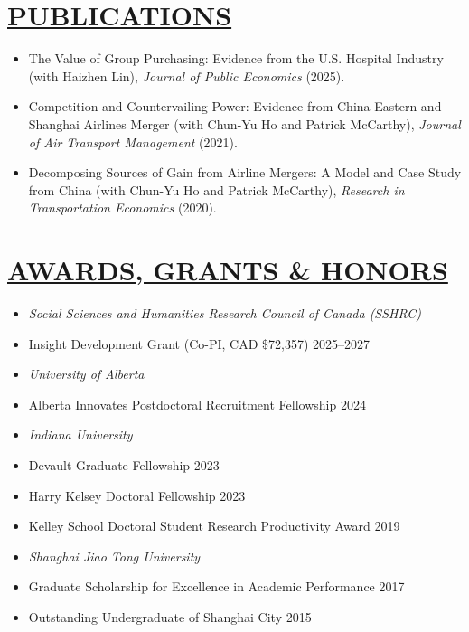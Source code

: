 \documentclass{res}
\begin{document}
\begin{resume}
\section{\large{\ul{PUBLICATIONS}}}
\vspace{1.8em}
\begin{itemize}[leftmargin=15pt,labelindent=-15pt,itemindent=-15pt,itemsep=0.1em]
    \item[] The Value of Group Purchasing: Evidence from the U.S. Hospital Industry (with Haizhen Lin), \textit{Journal of Public Economics} (2025).
    \item[] Competition and Countervailing Power: Evidence from China Eastern and Shanghai Airlines Merger (with Chun-Yu Ho and Patrick McCarthy), \textit{Journal of Air Transport Management} (2021).
    \item[] Decomposing Sources of Gain from Airline Mergers: A Model and Case Study from China (with Chun-Yu Ho and Patrick McCarthy), \textit{Research in Transportation Economics} (2020).
\end{itemize}

\section{\large{\ul{AWARDS, GRANTS \& HONORS}}}
\vspace{1.8em}
\begin{itemize}[leftmargin=15pt,labelindent=-15pt,itemindent=-15pt,itemsep=0.1em]
  \item[] \textit{Social Sciences and Humanities Research Council of Canada (SSHRC)}
      \item[] \hspace{13pt} Insight Development Grant (Co-PI, CAD \$72,357) \hfill 2025--2027
\item[] \textit{University of Alberta}
    \item[] \hspace{13pt} Alberta Innovates Postdoctoral Recruitment Fellowship \hfill 2024
\item[] \textit{Indiana University}
    \item[] \hspace{13pt} Devault Graduate Fellowship \hfill 2023
    \item[] \hspace{13pt} Harry Kelsey Doctoral Fellowship \hfill 2023
    \item[] \hspace{13pt} Kelley School Doctoral Student Research Productivity Award \hfill 2019
\item[] \textit{Shanghai Jiao Tong University}
    \item[] \hspace{13pt} Graduate Scholarship for Excellence in Academic Performance \hfill 2017
    \item[] \hspace{13pt} Outstanding Undergraduate of Shanghai City \hfill 2015
\end{itemize}


\end{resume}
\end{document}
